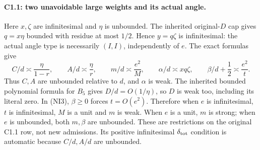 \paragraph{C1.1: two unavoidable large weights and its actual angle.}
Here $x,\zeta$ are infinitesimal and $\eta$ is unbounded.
The inherited original-$D$ cap gives $q=x\eta$ bounded with
residue at most $1/2$. Hence $y=q\zeta$ is infinitesimal:
the actual angle type is necessarily $(I,I)$, independently of $e$.
The exact formulas give
\[
 C/d\asymp\frac{\eta}{1-r},\qquad
 A/d\asymp\frac{\eta}{r},\qquad
 m/d\asymp\frac{e^2}{M},\qquad
 \alpha/d\asymp xq\zeta,\qquad
 \beta/d+\frac12\asymp\frac{e^2}{t}.             \tag{NI3}
\]
Thus $C,A$ are unbounded relative to $d$, and $\alpha$ is weak.
The inherited bounded polynomial formula for $B_5$ gives $D/d=O(1/\eta)$,
so $D$ is weak too, including its literal zero. In (NI3), $\beta\ge0$
forces $t=O(e^2)$. Therefore when $e$ is infinitesimal, $t$ is
infinitesimal, $M$ is a unit and $m$ is weak. When $e$ is a unit,
$m$ is strong; when $e$ is unbounded, both $m,\beta$ are unbounded.
These are restrictions on the original C1.1 row, not new admissions.
Its positive infinitesimal $\delta_{\rm tot}$ condition is automatic
because $C/d,A/d$ are unbounded.


